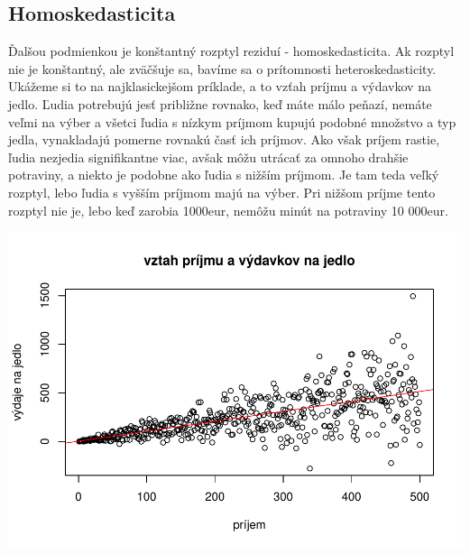 \hypertarget{homoskedasticita}{%
\subsection{Homoskedasticita}\label{homoskedasticita}}

Ďalšou podmienkou je konštantný rozptyl reziduí - homoskedasticita. Ak
rozptyl nie je konštantný, ale zväčšuje sa, bavíme sa o prítomnosti
heteroskedasticity. Ukážeme si to na najklasickejšom príklade, a to
vzťah príjmu a výdavkov na jedlo. Ľudia potrebujú jesť približne
rovnako, keď máte málo peňazí, nemáte veľmi na výber a všetci ľudia s
nízkym príjmom kupujú podobné množstvo a typ jedla, vynakladajú pomerne
rovnakú časť ich príjmov. Ako však príjem rastie, ľudia nezjedia
signifikantne viac, avšak môžu utrácať za omnoho drahšie potraviny, a
niekto je podobne ako ľudia s nižším príjmom. Je tam teda veľký rozptyl,
lebo ľudia s vyšším príjmom majú na výber. Pri nižšom príjme tento
rozptyl nie je, lebo keď zarobia 1000eur, nemôžu minút na potraviny 10
000eur.

\begin{Shaded}
\begin{Highlighting}[]
\StringTok{ }\OperatorTok{:}
\StringTok{ }\NormalTok{(} \NormalTok{, }  \OperatorTok{*}\StringTok{ }
\StringTok{ }\OperatorTok{~}\StringTok{ }

\NormalTok{(} \NormalTok{, } \NormalTok{,}
      \NormalTok{)}

 \NormalTok{)}
\end{Highlighting}
\end{Shaded}

\includegraphics{test_files/figure-latex/unnamed-chunk-51-1.pdf}

